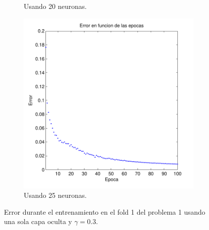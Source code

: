 \documentclass[informe.tex]{subfiles}
\begin{document}
\begin{figure}
\begin{subfigure}[b]{0.32\textwidth}
                \caption{Usando 20 neuronas.}
                \label{fig:d1-f1-03-n20}
        \end{subfigure}
        \begin{subfigure}[b]{0.32\textwidth}
                \includegraphics[width=\textwidth]{graficos/error_fold1_25_binary_100_03.pdf}
                \caption{Usando 25 neuronas.}
                \label{fig:d1-f1-03-n25}
        \end{subfigure}
        
        \caption{Error durante el entrenamiento en el fold 1 del problema 1 usando una sola capa oculta y $\gamma=0.3$.}\label{fig:p1-f1-gamma03}
    \end{figure}    
    
\end{document}

